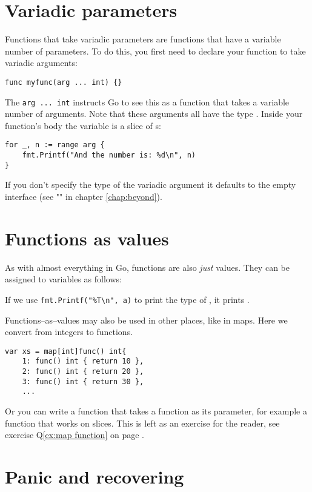 \section{Variadic parameters}
Functions that take variadic parameters are functions that have a
variable number of parameters. To do this, you first
need to declare your function to take variadic arguments:
\begin{lstlisting}[caption=Variadac parameters]
func myfunc(arg ... int) {}
\end{lstlisting}
The \lstinline{arg ... int} instructs Go to see this as a function that
takes a variable number of arguments. Note that these arguments all
have the type . Inside your function's body the variable
 is a slice of s:
\begin{lstlisting}
for _, n := range arg {
    fmt.Printf("And the number is: %d\n", n)
}
\end{lstlisting}

If you don't specify the type of the variadic argument it defaults to the
empty interface  (see "" in
chapter \ref{chap:beyond}).

\section{Functions as values}
\label{sec:functions as values}
As with almost everything in Go, functions are also \emph{just} values.
They can be assigned to variables as follows:

If we use \lstinline{fmt.Printf("%T\n", a)} to print the type of
, it prints .

Functions--as--values may also be used in other places, like in maps.
Here we convert from integers to functions.
\begin{lstlisting}[caption=Function as values in maps]
var xs = map[int]func() int{
    1: func() int { return 10 },
    2: func() int { return 20 },
    3: func() int { return 30 },
    ...
\end{lstlisting}
Or you can write a function that takes a function as its parameter, for
example a  function that works on  slices. This is
left as an exercise for the reader, see exercise Q\ref{ex:map function}
on page \pageref{ex:map function}.

\section{Panic and recovering}
\label{sec:panic}
\todo{}

